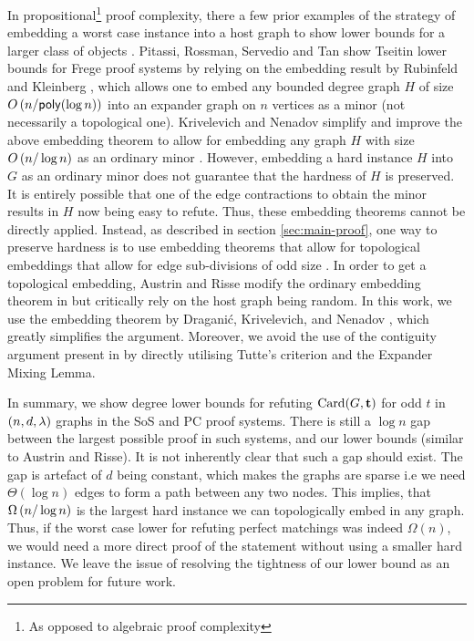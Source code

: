 \documentclass[11pt]{article}
\begin{document}
In propositional\footnote{As opposed to algebraic proof complexity} proof complexity, there a few prior examples of the strategy of embedding a worst case instance into a host graph to show lower bounds for a larger class of objects \cite{itsykson2021Near, pitassi2016PolyLogFrege}.
Pitassi, Rossman, Servedio and Tan show Tseitin lower bounds for Frege proof systems \citep{pitassi2016PolyLogFrege} by relying on the embedding result by Rubinfeld and Kleinberg \citep{kleinberg1996short}, which allows one to embed any bounded degree graph $H$ of size $O\left(n/\mathsf{poly}(\log n)\right)$ into an expander graph on $n$ vertices as a minor (not necessarily a topological one). 
Krivelevich and Nenadov simplify and improve the above embedding theorem to allow for embedding any graph $H$ with size $O\left(n/\log n\right)$ as an ordinary minor \citep{krivelevich2021completeMinors}.
However, embedding a hard instance $H$ into $G$ as an ordinary minor does not guarantee that the hardness of $H$ is preserved.
It is entirely possible that one of the edge contractions to obtain the minor results in $H$ now being easy to refute.
Thus, these embedding theorems cannot be directly applied.
Instead, as described in section \ref{sec:main-proof}, one way to preserve hardness is to use  embedding theorems that allow for topological embeddings that allow for edge sub-divisions of odd size \citep{draganic22rolling, nenadov2023routing}.
In order to get a topological embedding, Austrin and Risse modify the ordinary embedding theorem in \citep{krivelevich2021completeMinors} but critically rely on the host graph being random.
In this work, we use the embedding theorem by Dragani\'c, Krivelevich, and Nenadov \cite{draganic22rolling}, which greatly simplifies the argument. Moreover, we avoid the use of the contiguity argument present in \cite{Austrin_2022} by directly utilising Tutte's criterion and the Expander Mixing Lemma.

\par
In summary, we show degree lower bounds for refuting $\text{Card}(G, \mathbf{t})$ for odd $t$ in $(n, d, \lambda)$ graphs in the SoS and PC proof systems.
There is still a $\log n$ gap between the largest possible proof in such systems, and our lower bounds (similar to Austrin and Risse).
It is not inherently clear that such a gap should exist.
The gap is artefact of $d$ being constant, which makes the graphs are sparse i.e we need $\Theta(\log n)$ edges to form a path between any two nodes.
This implies, that $\Omega\left(n/\log n\right)$ is the largest hard instance we can topologically embed in any graph.
Thus, if the worst case lower for refuting perfect matchings was indeed $\Omega(n)$, we would need a more direct proof of the statement without using a smaller hard instance.
We leave the issue of resolving the tightness of our lower bound as an open problem for future work.



\clearpage
\appendix
\end{document}
